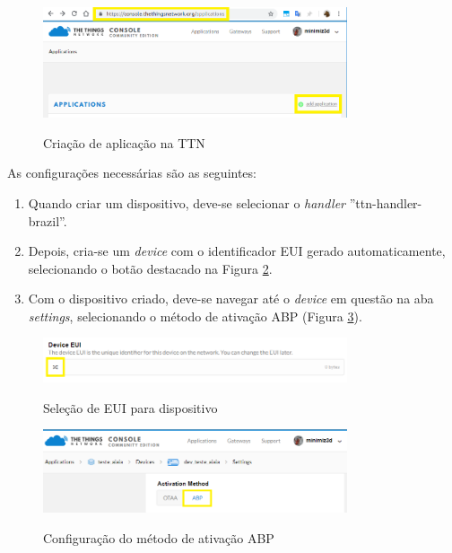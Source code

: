 \documentclass[oneside,openright,12pt]{ufsm_2015} %
\begin{document}
    \begin{figure}[ht]
 	    \caption{\label{exepretex} Criação de aplicação na TTN}
        \centering
        \includegraphics[width=0.8\textwidth]{figuras/teste.png}
        \vspace{\baselineskip} %
        \label{fig:add-app-ttn}
    \end{figure}
    
    As configurações necessárias são as seguintes:
    
    \begin{enumerate}
        \item Quando criar um dispositivo, deve-se selecionar o \textit{handler} ''ttn-handler-brazil''.
        \item Depois, cria-se um \textit{device} com o identificador EUI gerado automaticamente, selecionando o botão destacado na Figura \ref{fig:dev-eui-ttn}.
        \item Com o dispositivo criado, deve-se navegar até o \textit{device} em questão na aba \textit{settings}, selecionando o método de ativação ABP (Figura \ref{fig:dev-settings-ttn}).
    \end{enumerate}
    
    \begin{figure}[ht]
 	    \caption{\label{exepretex} Seleção de EUI para dispositivo}
        \centering
        \includegraphics[width=0.8\textwidth]{figuras/device_eui.png}
        \vspace{\baselineskip} %
        \label{fig:dev-eui-ttn}
    \end{figure}
    
    \begin{figure}[ht]
 	    \caption{\label{exepretex} Configuração do método de ativação ABP}
        \centering
        \includegraphics[width=0.8\textwidth]{figuras/device_settings.png}
        \vspace{\baselineskip} %
        \label{fig:dev-settings-ttn}
    \end{figure}
    
\end{document}

